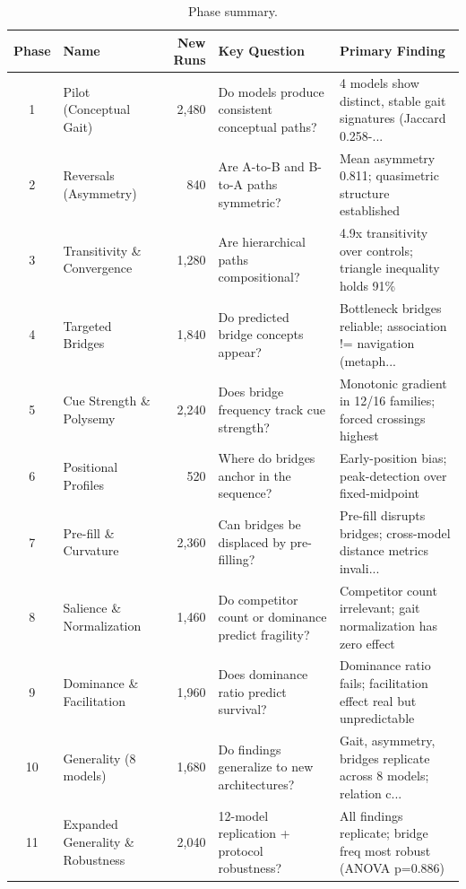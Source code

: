 \begin{table}[t]
\centering
\caption{Phase summary.}
\label{tab:phases}
\small
\begin{tabular}{cl r p{4.0cm} p{5.0cm}}
\toprule
Phase & Name & New Runs & Key Question & Primary Finding \\
\midrule
    1 & Pilot (Conceptual Gait) & 2,480 & Do models produce consistent conceptual paths? & 4 models show distinct, stable gait signatures (Jaccard 0.258-... \\
    2 & Reversals (Asymmetry) & 840 & Are A-to-B and B-to-A paths symmetric? & Mean asymmetry 0.811; quasimetric structure established \\
    3 & Transitivity \& Convergence & 1,280 & Are hierarchical paths compositional? & 4.9x transitivity over controls; triangle inequality holds 91\% \\
    4 & Targeted Bridges & 1,840 & Do predicted bridge concepts appear? & Bottleneck bridges reliable; association != navigation (metaph... \\
    5 & Cue Strength \& Polysemy & 2,240 & Does bridge frequency track cue strength? & Monotonic gradient in 12/16 families; forced crossings highest \\
    6 & Positional Profiles & 520 & Where do bridges anchor in the sequence? & Early-position bias; peak-detection over fixed-midpoint \\
    7 & Pre-fill \& Curvature & 2,360 & Can bridges be displaced by pre-filling? & Pre-fill disrupts bridges; cross-model distance metrics invali... \\
    8 & Salience \& Normalization & 1,460 & Do competitor count or dominance predict fragility? & Competitor count irrelevant; gait normalization has zero effect \\
    9 & Dominance \& Facilitation & 1,960 & Does dominance ratio predict survival? & Dominance ratio fails; facilitation effect real but unpredictable \\
    10 & Generality (8 models) & 1,680 & Do findings generalize to new architectures? & Gait, asymmetry, bridges replicate across 8 models; relation c... \\
    11 & Expanded Generality \& Robustness & 2,040 & 12-model replication + protocol robustness? & All findings replicate; bridge freq most robust (ANOVA p=0.886) \\
\bottomrule
\end{tabular}
\end{table}
